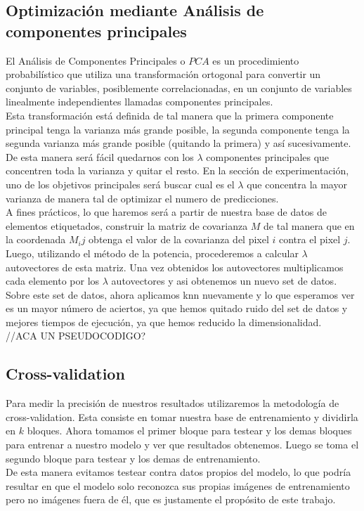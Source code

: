 \subsection{Optimización mediante Análisis de componentes principales}
El Análisis de Componentes Principales o $PCA$ es un procedimiento probabilístico que utiliza una transformación ortogonal para convertir un conjunto de variables, posiblemente correlacionadas, en un conjunto de variables linealmente independientes llamadas componentes principales.
\\
Esta transformación está definida de tal manera que la primera componente principal tenga la varianza más grande posible, la segunda componente tenga la segunda varianza más grande posible (quitando la primera) y así sucesivamente.
\\
De esta manera será fácil quedarnos con los $\lambda$ componentes principales que concentren toda la varianza y quitar el resto. En la sección de experimentación, uno de los objetivos principales será buscar cual es el $\lambda$ que concentra la mayor varianza de manera tal de optimizar el numero de predicciones. 
\\
A fines prácticos, lo que haremos será a partir de nuestra base de datos de elementos etiquetados, construir la matriz de covarianza $M$ de tal manera que en la coordenada $M_ij$ obtenga el valor de la covarianza del pixel $i$ contra el pixel $j$.
\\
Luego, utilizando el método de la potencia, procederemos a calcular $\lambda$ autovectores de esta matriz. Una vez obtenidos los autovectores multiplicamos cada elemento por los $\lambda$ autovectores y asi obtenemos un nuevo set de datos.
\\
Sobre este set de datos, ahora aplicamos knn nuevamente y lo que esperamos ver es un mayor número de aciertos, ya que hemos quitado ruido del set de datos y mejores tiempos de ejecución, ya que hemos reducido la dimensionalidad.
\\
//ACA UN PSEUDOCODIGO?

\subsection{Cross-validation}
Para medir la precisión de nuestros resultados utilizaremos la metodología de cross-validation. Esta consiste en tomar nuestra base de entrenamiento y dividirla en $k$ bloques. Ahora tomamos el primer bloque para testear y los demas bloques para entrenar a nuestro modelo y ver que resultados obtenemos. Luego se toma el segundo bloque para testear y los demas de entrenamiento.
\\
De esta manera evitamos testear contra datos propios del modelo, lo que podría resultar en que el modelo solo reconozca sus propias imágenes de entrenamiento pero no imágenes fuera de él, que es justamente el propósito de este trabajo.
